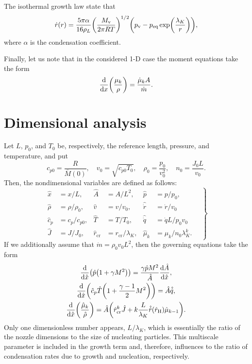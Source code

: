 \documentclass{article}
\newcommand{\vap}{\text{v}}
\newcommand{\eq}{\text{eq}}
\newcommand{\crit}[2][]{#2_\text{cr#1}}
\newcommand{\Hill}{\text{H}}
\begin{document}
The isothermal growth law state that
\begin{equation}\label{eq:dotr}
    \dot{r}(r) = \frac{5\pi\alpha}{16\rho_L}
    \qty(\frac{M_\vap}{2\pi RT})^{1/2}
        \qty(p_\vap-p_\eq\exp(\frac{\lambda_K}{r})),
\end{equation}
where $\alpha$ is the condensation coefficient.

Finally, let us note that in the considered 1-D case the moment equations take the form
\begin{equation}\label{eq:moments}
    \dv{x}(\frac{\mu_k}{\rho}) = \frac{\dot{\mu}_kA}{\dot{m}}.
\end{equation}

\section{Dimensional analysis}

Let $L$, $p_0$, and $T_0$ be, respectively, the reference length, pressure, and temperature, and put
\begin{equation}\label{eq:reference}
    c_{p0} = \frac{R}{\bar{M}(0)}, \quad v_0 = \sqrt{c_{p0}T_0}, \quad
    \rho_0 = \frac{p_0}{v_0^2}, \quad n_0 = \frac{J_0L}{v_0}.
\end{equation}
Then, the nondimensional variables are defined as follows:
\begin{equation}\label{eq:nondimensional}
    \left.\begin{aligned}
        \hat{x} &= x/L,             &\hat{A} &= A/L^2,              &\hat{p} &= p/p_0, \\
        \hat{\rho} &= \rho/\rho_0,  &\hat{v} &= v/v_0,              &\hat{\dot{r}} &= \dot{r}/v_0 \\
        \hat{c}_p &= c_p/c_{p0},    &\hat{T} &= T/T_0,              &\hat{\dot{q}} &= \dot{q}L/p_0v_0 \\
        \hat{J} &= J/J_0,    &\crit{\hat{r}} &= \crit{r}/\lambda_K, &\hat{\mu}_k &= \mu_k/n_0\lambda_K^k.
    \end{aligned}\quad\right\}
\end{equation}
If we additionally assume that $\dot{m} = \rho_0v_0L^2$, then the governing equations take the form
\begin{gather}
    \dv{\hat{x}}(\hat{p}\qty(1 + \gamma M^2))
        = \frac{\gamma \hat{p} M^2}{\hat{A}}\dv{\hat{A}}{\hat{x}}, \label{eq:momentum3}\\
    \dv{\hat{x}}(\hat{c}_p\hat{T}\qty(1 + \frac{\gamma-1}{2}M^2))
        = \hat{A}\hat{\dot{q}}, \label{eq:energy3}\\
    \dv{\hat{x}}(\frac{\hat{\mu}_k}{\hat{\rho}}) = \hat{A}\qty(\crit{\hat{r}}^{k}\hat{J}
        + k\frac{L}{\lambda_K}\hat{\dot{r}}(\hat{r}_\Hill)\hat{\mu}_{k-1}). \label{eq:moments3}
\end{gather}
Only one dimensionless number appears, $L/\lambda_K$, which is essentially the ratio of the nozzle dimensions
to the size of nucleating particles. This multiscale parameter is included in the growth term
and, therefore, influences to the ratio of condensation rates due to growth and nucleation, respectively.

\end{document}
